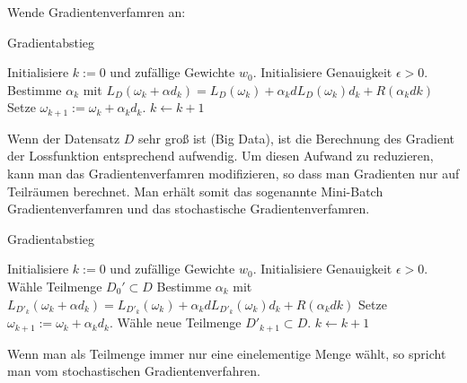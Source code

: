 Wende Gradientenverfamren an:

\begin{algorithm}
\caption{Gradientabstieg}
\begin{algorithmic}[1]
    \State Initialisiere $k:=0$ und zufällige Gewichte $w_0$.
\State Initialisiere Genauigkeit $\epsilon > 0$.
      
        \State Bestimme $\alpha_k$  mit $ L_D(\omega_k + \alpha d_k) =  L_D(\omega_k) + \alpha_k d L_D(\omega_k)d_k + R( \alpha_k dk)$ 
        \State Setze $\omega_{k+1} := \omega_k  + \alpha_k d_k$. 
 	\State  $k \leftarrow k+1$ 
    \EndWhile  \label{roy's loop}


\end{algorithmic}
\end{algorithm}

Wenn der Datensatz $D$ sehr groß ist (Big Data), ist die Berechnung des Gradient der Lossfunktion entsprechend aufwendig. Um diesen Aufwand zu reduzieren,
kann man das Gradientenverfamren modifizieren, so dass man Gradienten nur auf Teilräumen berechnet. Man erhält somit das sogenannte Mini-Batch Gradientenverfamren und das stochastische Gradientenverfamren.

\begin{algorithm}
\caption{Gradientabstieg}
\begin{algorithmic}[1]
    \State Initialisiere $k:=0$ und zufällige Gewichte $w_0$.
\State Initialisiere Genauigkeit $\epsilon > 0$.
\State Wähle Teilmenge $D_0' \subset D$
      
        \State Bestimme $\alpha_k$  mit $ L_{D'_k}(\omega_k + \alpha d_k) =  L_{D'_k}(\omega_k) + \alpha_k d L_{D'_k}(\omega_k)d_k + R( \alpha_k dk)$ 
        \State Setze $\omega_{k+1} := \omega_k  + \alpha_k d_k$. 
	\State Wähle neue Teilmenge $D'_{k +1} \subset D$.
 	\State  $k \leftarrow k+1$ 
    \EndWhile  \label{roy's loop}


\end{algorithmic}
\end{algorithm}

Wenn man als Teilmenge immer nur eine einelementige Menge wählt, so spricht man vom stochastischen Gradientenverfahren.

